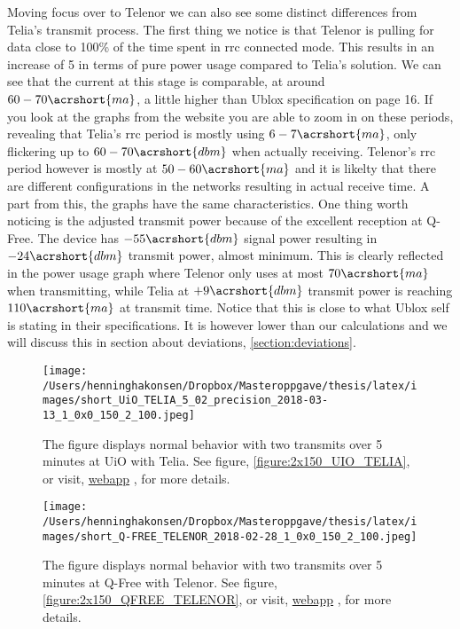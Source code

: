 \documentclass[USenglish]{ifimaster}  %
\begin{document}
Moving focus over to Telenor we can also see some distinct differences from Telia's transmit process. The first thing we notice is that Telenor is pulling for data close to 100\% of the time spent in \acrshort{rrc} connected mode. This results in an increase of 5 in terms of pure power usage compared to Telia's solution. We can see that the current at this stage is comparable, at around ${60-70 \acrshort{ma}}$, a little higher than Ublox specification on page 16\cite{datasheet:ubloxchip}. If you look at the graphs from the website you are able to zoom in on these periods, revealing that Telia's \acrshort{rrc} period is mostly using ${6-7 \acrshort{ma}}$, only flickering up to ${60-70 \acrshort{dbm}}$ when actually receiving. Telenor's \acrshort{rrc} period however is mostly at ${50-60 \acrshort{ma}}$ and it is likelty that there are different configurations in the networks resulting in actual receive time. A part from this, the graphs have the same characteristics. One thing worth noticing is the adjusted transmit power because of the excellent reception at Q-Free. The device has ${-55 \acrshort{dbm}}$ signal power resulting in ${-24 \acrshort{dbm}}$ transmit power, almost minimum. This is clearly reflected in the power usage graph where Telenor only uses at most ${70 \acrshort{ma}}$ when transmitting, while Telia at ${+9 \acrshort{dbm}}$ transmit power is reaching ${110 \acrshort{ma}}$ at transmit time. Notice that this is close to what Ublox self is stating in their specifications. It is however lower than our calculations and we will discuss this in section about deviations, \vref{section:deviations}.

\begin{figure}[H]
  \centering
  \texttt{[image: /Users/henninghakonsen/Dropbox/Masteroppgave/thesis/latex/images/short\_UiO\_TELIA\_5\_02\_precision\_2018-03-13\_1\_0x0\_150\_2\_100.jpeg]}
  \caption[Short-term test - normal behavior, Telia]{The figure displays normal behavior with two transmits over 5 minutes at UiO with Telia. See figure, \vref{figure:2x150_UIO_TELIA}, or visit, \href{http://158.39.77.97:9000/\#/results/Q-FREE\_TELENOR\_2018-02-28\_1\_0x0\_150\_2\_100}{webapp} \cite{online:result1}, for more details.}
  \label{figure:2x150_UIO_TELIA_SHORT}
\end{figure}

\begin{figure}[H]
  \centering
  \texttt{[image: /Users/henninghakonsen/Dropbox/Masteroppgave/thesis/latex/images/short\_Q-FREE\_TELENOR\_2018-02-28\_1\_0x0\_150\_2\_100.jpeg]}
  \caption[Short-term test - normal behavior, Telenor]{The figure displays normal behavior with two transmits over 5 minutes at Q-Free with Telenor. See figure, \vref{figure:2x150_QFREE_TELENOR}, or visit, \href{http://158.39.77.97:9000/\#/results/Q-FREE\_TELENOR\_5.02\_2018-03-07\_0\_0x0\_40\_1\_200}{webapp} \cite{online:result2}, for more details.}
  \label{figure:2x150_QFREE_TELENOR_SHORT}
\end{figure}
\end{document}
